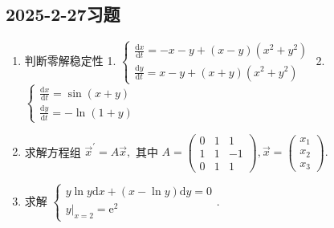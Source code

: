 \subsection{2025-2-27习题}

\begin{enumerate}
    \item 判断零解稳定性
    1. $\begin{cases}\frac{\mathrm{d}x}{\mathrm{d}t}=-x-y+(x-y)(x^{2}+y^{2}) \\ \frac{\mathrm{d}y}{\mathrm{d}t}=x-y+(x+y)(x^{2}+y^{2})\end{cases}$
    2. $\begin{cases} \frac{\mathrm{d}x}{\mathrm{d}t}=\sin(x+y) \\ \frac{\mathrm{d}y}{\mathrm{d}t}=-\ln(1+y)\end{cases}$
    \item 求解方程组 $\vec{x}^\prime=A\vec{x},$ 其中 $A=\begin{pmatrix}0 & 1 & 1 \\ 1 & 1 & -1 \\ 0 & 1 & 1\end{pmatrix},\vec{x}=\begin{pmatrix}x_{1} \\ x_{2} \\ x_{3}\end{pmatrix}.$
    \item 求解 $\begin{cases}y\ln y\mathrm{d}x+(x-\ln y)\mathrm{d}y=0 \\ y|_{x=2}=\mathrm{e}^{ 2} \end{cases}.$
\end{enumerate}
